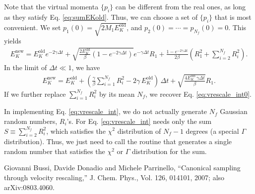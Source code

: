 \documentclass[11pt]{article}
\begin{document}
Note that the virtual momenta $\{p_i\}$
  can be different from the real ones,
  as long as they satisfy Eq. \eqref{eq:sumEKold}.
%
Thus, we can choose a set of $\{p_i\}$
that is most convenient.
%
We set
$p_1(0) = \sqrt{2 M_1 E_K^\mathrm{old}}$,
and
$p_2(0) = \cdots = p_{N_f}(0) = 0$.
%
This yields\cite{bdp2007}
\begin{align}
  E_K^\mathrm{new}
= E_K^\mathrm{old} e^{-2\gamma \Delta t}
  + \sqrt{ \frac {2 E_K^\mathrm{old}} {\beta} (1 - e^{-2\gamma \Delta t}) }
  e^{-\gamma \Delta t} R_1
 + \frac{ 1 - e^{-2\gamma \Delta t}}{ 2 \beta }
 \left( R_1^2 + \sum_{i = 2}^{N_f} R_i^2 \right).
 \label{eq:vrescale_int}
\end{align}
%
In the limit of $\Delta t \ll 1$,
we have
\begin{align*}
  E_K^\mathrm{new}
= E_K^\mathrm{old}
+ \left( \frac{ \gamma }{ \beta }
    \sum_{i = 1}^{N_f} R_i^2 - 2 \gamma \, E_K^\mathrm{old}
  \right) \, \Delta t
  + \sqrt{ \frac {4 E_K^\mathrm{old} \, \gamma \Delta t} {\beta} }
    R_1.
\end{align*}
If we further replace $\sum_{i = 1}^{N_f} R_i^2$ by its mean $N_f$,
we recover Eq. \eqref{eq:vrescale_int0}.

In implementing Eq. \eqref{eq:vrescale_int},
we do not actually generate $N_f$ Gaussian random numbers, $R_i$'s.
%
For Eq. \eqref{eq:vrescale_int} needs only the sum $S \equiv \sum_{i = 2}^{N_f} R_i^2$,
which satisfies the $\chi^2$ distribution of $N_f - 1$ degrees
(a special $\Gamma$ distribution).
%
Thus, we just need to call the routine that generates
a single random number that satisfies the $\chi^2$ or $\Gamma$ distribution
for the sum.






\begin{thebibliography}{100}

  Giovanni Bussi, Davide Donadio and Michele Parrinello,
  ``Canonical sampling through velocity rescaling,''
  J. Chem. Phys., Vol. 126, 014101,
  2007;
  also arXiv:0803.4060.

\end{thebibliography}
\end{document}
